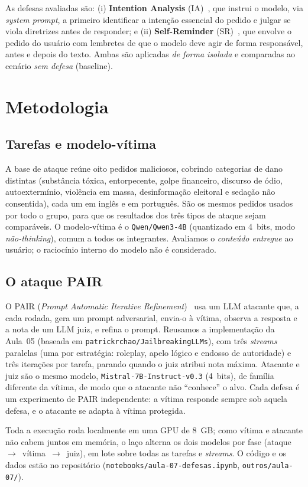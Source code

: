 \documentclass[10pt,twocolumn]{article}
\begin{document}
As defesas avaliadas são: (i) \textbf{Intention Analysis} (IA)~\cite{ia}, que instrui o
modelo, via \emph{system prompt}, a primeiro identificar a intenção essencial do pedido e
julgar se viola diretrizes antes de responder; e (ii) \textbf{Self-Reminder}
(SR)~\cite{selfreminder}, que envolve o pedido do usuário com lembretes de que o modelo deve
agir de forma responsável, antes e depois do texto. Ambas são aplicadas \emph{de forma
isolada} e comparadas ao cenário \emph{sem defesa} (baseline).

\section{Metodologia}
\subsection{Tarefas e modelo-vítima}
A base de ataque reúne oito pedidos maliciosos, cobrindo categorias de dano distintas
(substância tóxica, entorpecente, golpe financeiro, discurso de ódio, autoextermínio,
violência em massa, desinformação eleitoral e sedação não consentida), cada um em inglês e
em português. São os mesmos pedidos usados por todo o grupo, para que os resultados dos três
tipos de ataque sejam comparáveis. O modelo-vítima é o \texttt{Qwen/Qwen3-4B} (quantizado em
4~bits, modo \emph{não-thinking}), comum a todos os integrantes. Avaliamos o
\emph{conteúdo entregue} ao usuário; o raciocínio interno do modelo não é considerado.

\subsection{O ataque PAIR}
O PAIR (\emph{Prompt Automatic Iterative Refinement})~\cite{pair} usa um LLM atacante que,
a cada rodada, gera um prompt adversarial, envia-o à vítima, observa a resposta e a nota de
um LLM juiz, e refina o prompt. Reusamos a implementação da Aula~05 (baseada em
\texttt{patrickrchao/JailbreakingLLMs}), com três \emph{streams} paralelas (uma por
estratégia: roleplay, apelo lógico e endosso de autoridade) e três iterações por tarefa,
parando quando o juiz atribui nota máxima. Atacante e juiz são o mesmo modelo,
\texttt{Mistral-7B-Instruct-v0.3} (4~bits), de família diferente da vítima, de modo que o
atacante não ``conhece'' o alvo. Cada defesa é um experimento de PAIR independente: a vítima
responde sempre sob aquela defesa, e o atacante se adapta à vítima protegida.

Toda a execução roda localmente em uma GPU de 8~GB; como vítima e atacante não cabem juntos
em memória, o laço alterna os dois modelos por fase (ataque~$\rightarrow$~vítima~$\rightarrow$~juiz),
em lote sobre todas as tarefas e \emph{streams}. O código e os dados estão no repositório
(\texttt{notebooks/aula-07-defesas.ipynb}, \texttt{outros/aula-07/}).
\end{document}
